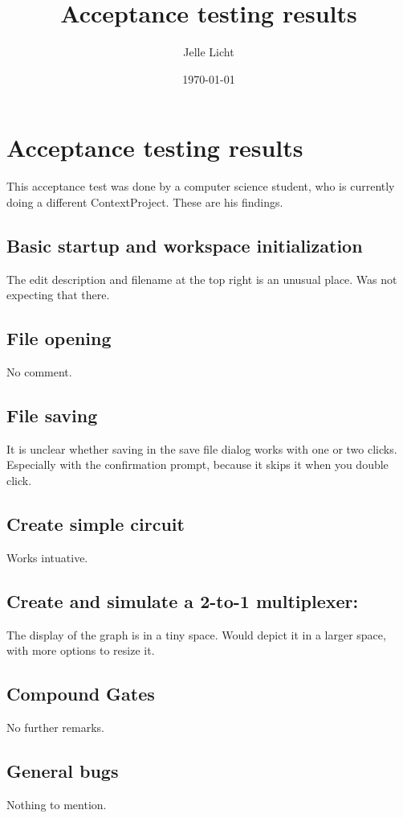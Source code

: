 \documentclass[a4paper]{article}
\begin{document}
\title{Acceptance testing results}
\author{Jelle Licht}
\date{\today}
\maketitle



\section{Acceptance testing results}
This acceptance test was done by a computer science student, who is currently doing a different ContextProject. These are his findings.

\subsection{Basic startup and workspace initialization}
The edit description and filename at the top right is an unusual place. Was not expecting that there.

\subsection{File opening}
No comment.

\subsection{File saving}
It is unclear whether saving in the save file dialog works with one or two clicks. Especially with the confirmation prompt, because it skips it when you double click.

\subsection{Create simple circuit}
Works intuative.

\subsection{Create and simulate a 2-to-1 multiplexer:}
The display of the graph is in a tiny space. Would depict it in a larger space, with more options to resize it.

\subsection{Compound Gates}
No further remarks.

\subsection{General bugs}
Nothing to mention.
\end{document}
